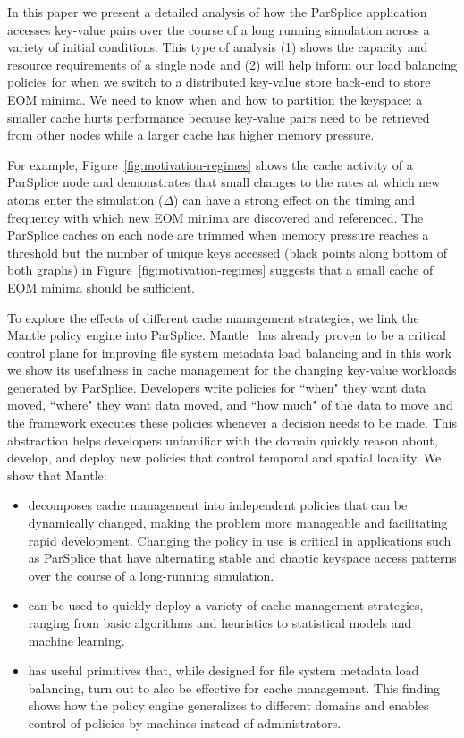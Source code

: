 In this paper we present a detailed analysis of how the ParSplice application
accesses key-value pairs over the course of a long running simulation across a
variety of initial conditions.  This type of analysis (1) shows the capacity
and resource requirements of a single node and (2) will help inform our load
balancing policies for when we switch to a distributed key-value store back-end
to store EOM minima. We need to know when and how to partition the keyspace: a
smaller cache hurts performance because key-value pairs need to be retrieved
from other nodes while a larger cache has higher memory pressure.

For example, Figure~\ref{fig:motivation-regimes} shows the
cache activity of a ParSplice node and demonstrates that small changes to the
rates at which new atoms enter the simulation (\(\Delta\)) can have a strong
effect on the timing and frequency with which new EOM minima are discovered and
referenced.  The ParSplice caches on each node are trimmed when memory pressure
reaches a threshold but the number of unique keys accessed (black points
along bottom of both graphs) in Figure~\ref{fig:motivation-regimes} suggests
that a small cache of EOM minima should be sufficient. 

To explore the effects of different cache management strategies, we link the
Mantle policy engine into ParSplice.  Mantle~\cite{sevilla:sc15-mantle} has
already proven to be a critical control plane for improving file system
metadata load balancing  and in this work we show its usefulness in cache
management for the changing key-value workloads generated by ParSplice.
Developers write policies for ``when" they want data moved, ``where" they want
data moved, and ``how much" of the data to move and the framework executes
these policies whenever a decision needs to be made.  This abstraction helps
developers unfamiliar with the domain quickly reason about, develop, and deploy
new policies that control temporal and spatial locality. We show that Mantle:

\begin{itemize}

  \item decomposes cache management into independent policies that can be
  dynamically changed, making the problem more manageable and facilitating rapid
  development. Changing the policy in use is critical in applications such as
  ParSplice that have alternating stable and chaotic keyspace access patterns
  over the course of a long-running simulation.  

  \item can be used to quickly deploy a variety of cache management strategies,
  ranging from basic algorithms and heuristics to statistical models and machine
  learning.

  \item has useful primitives that, while designed for file system metadata
  load balancing, turn out to also be effective for cache management. This
  finding shows how the policy engine generalizes to different domains and
  enables control of policies by machines instead of administrators.

\end{itemize}

